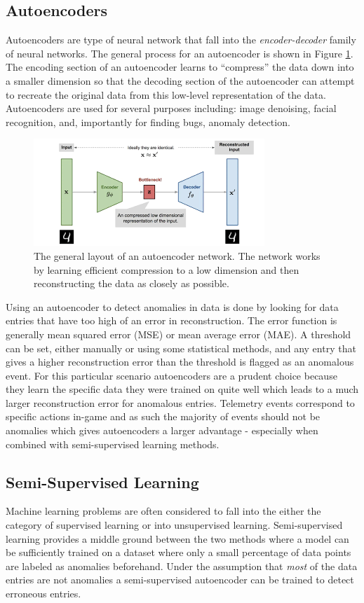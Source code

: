 \documentclass[a4paper,11pt]{article}
\begin{document}
\subsection{Autoencoders}
Autoencoders are type of neural network that fall into the \textit{encoder-decoder} family of neural networks. The general process for an autoencoder is shown in Figure \ref{autoencoder_general}. The encoding section of an autoencoder learns to ``compress'' the data down into a smaller dimension so that the decoding section of the autoencoder can attempt to recreate the original data from this low-level representation of the data. Autoencoders are used for several purposes including: image denoising, facial recognition, and, importantly for finding bugs, anomaly detection.
\begin{figure}[H]
\centering
\includegraphics[width=.8\textwidth]{autoencoder_general.png}
\caption{The general layout of an autoencoder network. The network works by learning efficient compression to a low dimension and then reconstructing the data as closely as possible.}
\label{autoencoder_general}
\end{figure}
Using an autoencoder to detect anomalies in data is done by looking for data entries that have too high of an error in reconstruction. The error function is generally mean squared error (MSE) or mean average error (MAE). A threshold can be set, either manually or using some statistical methods, and any entry that gives a higher reconstruction error than the threshold is flagged as an anomalous event. For this particular scenario autoencoders are a prudent choice because they learn the specific data they were trained on quite well which leads to a much larger reconstruction error for anomalous entries. Telemetry events correspond to specific actions in-game and as such the majority of events should not be anomalies which gives autoencoders a larger advantage - especially when combined with semi-supervised learning methods.
\subsection{Semi-Supervised Learning}
Machine learning problems are often considered to fall into the either the category of supervised learning or into unsupervised learning. Semi-supervised learning provides a middle ground between the two methods where a model can be sufficiently trained on a dataset where only a small percentage of data points are labeled as anomalies beforehand. Under the assumption that \textit{most} of the data entries are not anomalies a semi-supervised autoencoder can be trained to detect erroneous entries.
\end{document}
